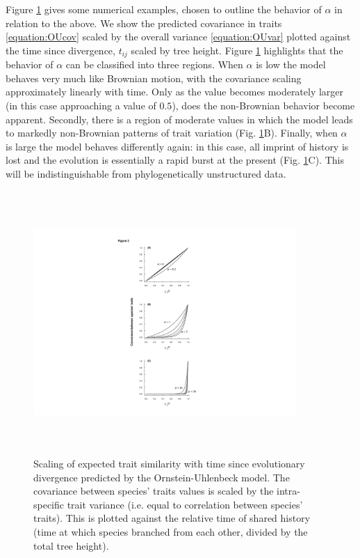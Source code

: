 \documentclass[a4paper,12pt]{article}
\begin{document}
Figure \ref{figure.traitsim} gives some numerical examples, chosen to outline the behavior of $\alpha$ in relation to the above. We show the predicted covariance in traits \ref{equation:OUcov} scaled by the overall variance \ref{equation:OUvar} plotted against the time since divergence, $t_{ij}$ scaled by tree height. Figure \ref{figure.traitsim} highlights that the behavior of $\alpha$ can be classified into three regions. When $\alpha$ is low the model behaves very much like Brownian motion, with the covariance scaling approximately linearly with time. Only as the value becomes moderately larger (in this case approaching a value of $0.5$), does the non-Brownian behavior become apparent. Secondly, there is a region of moderate values in which the model leads to markedly non-Brownian patterns of trait variation (Fig. \ref{figure.traitsim}B).  Finally, when $\alpha$ is large the model behaves differently again: in this case, all imprint of history is lost and the evolution is essentially a rapid burst at the present (Fig. \ref{figure.traitsim}C). This will be indistinguishable from phylogenetically unstructured data.  

\begin{figure}
\centering
    \includegraphics[width=10cm, height=10cm, keepaspectratio=true]{Figures/OU_figure2.pdf}
\caption{Scaling of expected trait similarity with time since evolutionary divergence predicted by the Ornstein-Uhlenbeck model. The covariance between species’ traits values is scaled by the intra-specific trait variance (i.e. equal to correlation between species’ traits). This is plotted against the relative time of shared history (time at which species branched from each other, divided by the total tree height). }
\label{figure.traitsim}
\end{figure}
\end{document}
